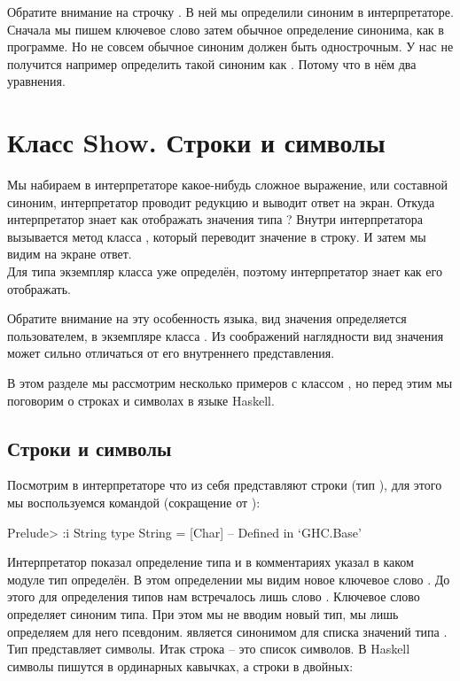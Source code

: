 Обратите внимание на строчку . В ней мы
определили синоним в интерпретаторе. Сначала мы пишем ключевое слово
 затем обычное определение синонима, как в программе. Но не
совсем обычное синоним должен быть однострочным. У нас не получится
например определить такой синоним как . Потому что в нём два
уравнения.

\section{Класс Show. Строки и символы}

Мы набираем в интерпретаторе какое-нибудь сложное выражение, или
составной синоним, интерпретатор проводит редукцию и выводит ответ на
экран. Откуда интерпретатор знает как отображать значения типа
? Внутри интерпретатора вызывается метод класса ,
который переводит значение в строку. И затем мы видим на экране
ответ.\\Для типа  экземпляр класса  уже определён,
поэтому интерпретатор знает как его отображать.

Обратите внимание на эту особенность языка, вид значения определяется
пользователем, в экземпляре класса . Из соображений наглядности
вид значения может сильно отличаться от его внутреннего представления.

В этом разделе мы рассмотрим несколько примеров с классом , но
перед этим мы поговорим о строках и символах в языке Haskell.

\subsection{Строки и символы}

Посмотрим в интерпретаторе что из себя представляют строки (тип
), для этого мы воспользуемся командой  (сокращение от
):


\begin{code}
Prelude> :i String
type String = [Char] 	-- Defined in `GHC.Base'
\end{code}

Интерпретатор показал определение типа и в комментариях указал в каком
модуле тип определён. В этом определении мы видим новое ключевое слово
. До этого для определения типов нам встречалось лишь слово
. Ключевое слово  определяет синоним типа. При этом мы
не вводим новый тип, мы лишь определяем для него псевдоним. 
является синонимом для списка значений типа . Тип 
представляет символы. Итак строка -- это список символов. В Haskell
символы пишутся в ординарных кавычках, а строки в двойных:


